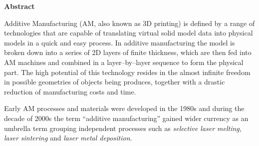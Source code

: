 \thispagestyle{empty}
\begin{center}
	{\Large\bfseries Abstract}
\end{center}

Additive Manufacturing (AM, also known as 3D printing) is defined by a range of technologies that are capable of translating virtual solid model data into physical models in a quick and easy process. In additive manufacturing the model is broken down into a series of 2D layers of finite thickness, which are then fed into AM machines and combined in a layer--by--layer sequence to form the physical part. The high potential of this technology resides in the almost infinite freedom in possible geometries of objects being produces, together with a drastic reduction of manufacturing costs and time.

Early AM processes and materials were developed in the 1980s and during the decade of 2000s the term ``additive manufacturing'' gained wider currency as an umbrella term grouping independent processes such as \textit{selective laser melting}, \textit{laser sintering} and \textit{laser metal deposition}.